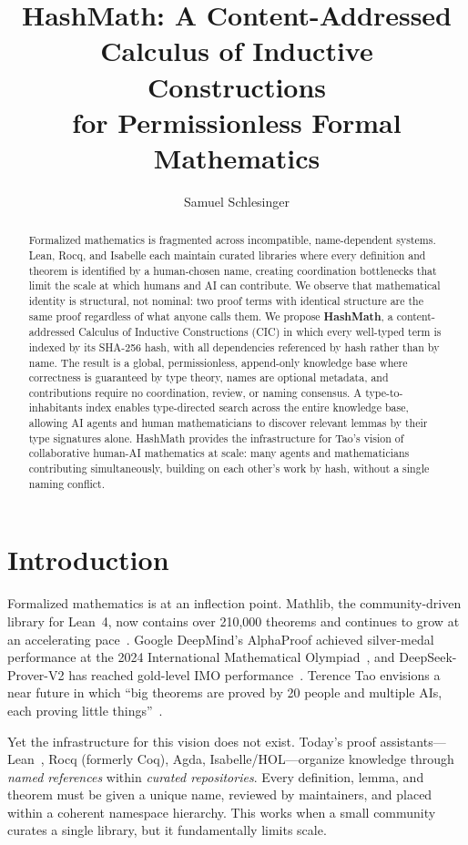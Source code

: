 \documentclass[11pt]{article}
\title{\textbf{HashMath: A Content-Addressed Calculus of Inductive Constructions\\ for Permissionless Formal Mathematics}}
\author{Samuel Schlesinger}
\date{}
\theoremstyle{definition}
\theoremstyle{plain}
\theoremstyle{remark}
\begin{document}
\maketitle

\begin{abstract}
Formalized mathematics is fragmented across incompatible, name-dependent systems.
Lean, Rocq, and Isabelle each maintain curated libraries where every definition and theorem
is identified by a human-chosen name, creating coordination bottlenecks that limit the
scale at which humans and AI can contribute.
We observe that mathematical identity is structural, not nominal: two proof terms with
identical structure are the same proof regardless of what anyone calls them.
We propose \textbf{HashMath}, a content-addressed Calculus of Inductive Constructions (CIC)
in which every well-typed term is indexed by its SHA-256 hash, with all dependencies
referenced by hash rather than by name.
The result is a global, permissionless, append-only knowledge base where correctness is
guaranteed by type theory, names are optional metadata, and contributions require
no coordination, review, or naming consensus.
A type-to-inhabitants index enables type-directed search across the entire knowledge base,
allowing AI agents and human mathematicians to discover relevant lemmas by their type
signatures alone.
HashMath provides the infrastructure for Tao's vision of collaborative human-AI mathematics
at scale: many agents and mathematicians contributing simultaneously, building on each
other's work by hash, without a single naming conflict.
\end{abstract}

\section{Introduction}
\label{sec:intro}

Formalized mathematics is at an inflection point.
Mathlib, the community-driven library for Lean~4, now contains over 210,000 theorems
and continues to grow at an accelerating pace~\cite{mathlib}.
Google DeepMind's AlphaProof achieved silver-medal performance at the 2024 International
Mathematical Olympiad~\cite{alphaproof}, and DeepSeek-Prover-V2 has reached
gold-level IMO performance~\cite{deepseek}.
Terence Tao envisions a near future in which ``big theorems are proved by 20 people and
multiple AIs, each proving little things''~\cite{tao2025}.

Yet the infrastructure for this vision does not exist.
Today's proof assistants---Lean~\cite{lean4}, Rocq (formerly Coq), Agda, Isabelle/HOL---organize
knowledge through \emph{named references} within \emph{curated repositories}.
Every definition, lemma, and theorem must be given a unique name, reviewed by maintainers,
and placed within a coherent namespace hierarchy.
This works when a small community curates a single library, but it fundamentally limits scale.
\end{document}

